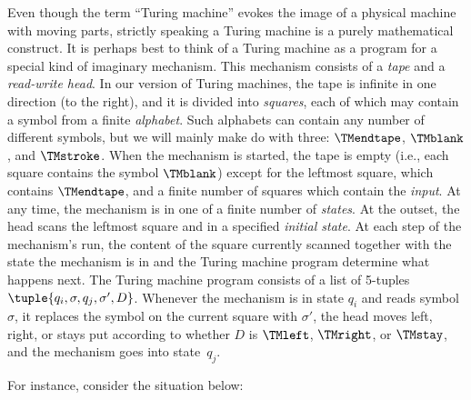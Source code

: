 \documentclass[../../../include/open-logic-section]{subfiles}
\begin{document}

\begin{explain}
Even though the term ``Turing machine'' evokes the image of
a physical machine with moving parts, strictly speaking a Turing machine is
a purely mathematical construct. It is perhaps best to think of a Turing
machine as a program for a special kind of imaginary mechanism. This
mechanism consists of a \emph{tape} and a \emph{read-write head}. In our
version of Turing machines, the tape is infinite in one direction (to the
right), and it is divided into \emph{squares}, each of which may contain a
symbol from a finite \emph{alphabet}. Such alphabets can contain any number
of different symbols, but we will mainly make do with three: $\TMendtape$,
$\TMblank$, and $\TMstroke$. When the mechanism is started, the tape is
empty (i.e., each square contains the symbol $\TMblank$) except for the
leftmost square, which contains $\TMendtape$, and a finite number of
squares which contain the \emph{input}. At any time, the mechanism is in
one of a finite number of \emph{states}. At the outset, the head scans the
leftmost square and in a specified \emph{initial state}. At each step of
the mechanism's run, the content of the square currently scanned together
with the state the mechanism is in and the Turing machine program determine
what happens next. The Turing machine program consists of a list of
5-tuples $\tuple{q_i, \sigma, q_j, \sigma', D}$. Whenever the
mechanism is in state $q_i$ and reads symbol $\sigma$, it replaces the
symbol on the current square with $\sigma'$, the head moves left, right, or
stays put according to whether $D$ is $\TMleft$, $\TMright$, or $\TMstay$,
and the mechanism goes into state~$q_j$.

For instance, consider the situation below:

\begin{center}
  \usetikzlibrary{calc, chains, shapes, decorations.pathmorphing}
\end{center}
\end{explain}
\end{document}
